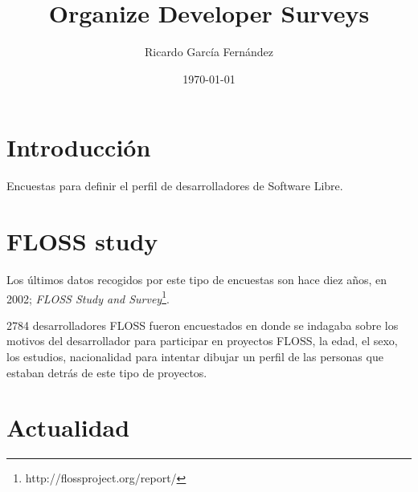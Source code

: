 \documentclass[11pt]{article}
\title{\textbf{Organize Developer Surveys}}
\author{Ricardo Garc\'ia Fern\'andez}
\date{\today}
\begin{document}
\maketitle

\section{Introducci\'on}

\par Encuestas para definir el perfil de desarrolladores de Software Libre.

\section{FLOSS study}

\par Los últimos datos recogidos por este tipo de encuestas son hace diez años, en 2002; \emph{FLOSS Study and Survey}\footnote{http://flossproject.org/report/}.

\par 2784 desarrolladores FLOSS fueron encuestados en donde se indagaba sobre los motivos del desarrollador para participar en proyectos FLOSS, la edad, el sexo, los estudios, nacionalidad para intentar dibujar un perfil de las personas que estaban detrás de este tipo de proyectos.

\section{Actualidad}
\end{document}
